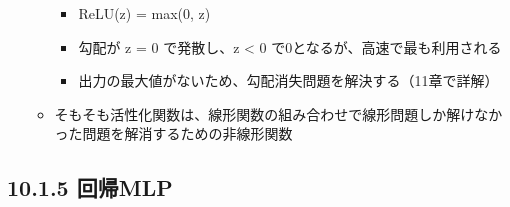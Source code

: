 \begin{itemize}
\begin{itemize}
    \begin{itemize}
    \tightlist
    \item
      ReLU(z) = max(0, z)
    \item
      勾配が z = 0 で発散し、z \textless{} 0
      で0となるが、高速で最も利用される
    \item
      出力の最大値がないため、勾配消失問題を解決する（11章で詳解）
    \end{itemize}
  \item
    そもそも活性化関数は、線形関数の組み合わせで線形問題しか解けなかった問題を解消するための非線形関数
  \end{itemize}
\end{itemize}

\hypertarget{ux56deux5e30mlp}{%
\subsection{10.1.5 回帰MLP}\label{ux56deux5e30mlp}}

